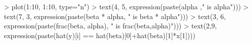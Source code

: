 \begin{Schunk}
\begin{Sinput}
> plot(1:10, 1:10, type="n")
> text(4, 5, expression(paste(alpha  ," is alpha")))
> text(7, 3, expression(paste(beta * alpha, " is beta * alpha")))
> text(3, 6, expression(paste(frac(beta, alpha), " is frac(beta,alpha)")))
> text(2,9, expression(paste(hat(y)[i] == hat(beta)[0]+hat(beta)[1]*x[1])))
\end{Sinput}
\end{Schunk}
